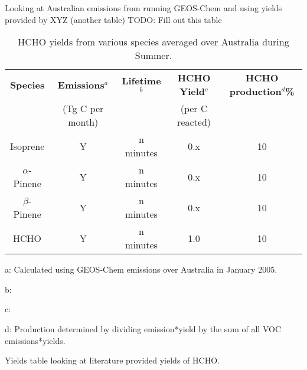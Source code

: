     Looking at Australian emissions from running GEOS-Chem and using yields provided by XYZ (another table)
    TODO: Fill out this table
    \begin{table} \begin{threeparttable}
      \caption{HCHO yields from various species averaged over Australia during Summer.}
      \begin{tabular}{ | c  c  c  c  c | }
        \toprule
	  \textbf{Species}   & \textbf{Emissions$^a$}& \textbf{Lifetime$^b$}& \textbf{HCHO Yield$^c$} & \textbf{HCHO production$^d$\%}
	  \\                 & (Tg C per month)      &                      & (per C reacted)         &         \\
	\midrule
	  Isoprene           & Y                     & n minutes            & 0.x                     & 10       \\
	  $\alpha$-Pinene    & Y                     & n minutes            & 0.x                     & 10       \\
	  $\beta$-Pinene     & Y                     & n minutes            & 0.x                     & 10       \\
	  HCHO               & Y                     & n minutes            & 1.0                     & 10       \\
	\bottomrule
      \end{tabular}
      \begin{tablenotes} 
	  \item a: Calculated using GEOS-Chem emissions over Australia in January 2005.
	  \item b:  
	  \item c: 
	  \item d: Production determined by dividing emission*yield by the sum of all VOC emissions*yields. 
      \end{tablenotes}
      \label{ch_isop:tab:VOCAusYields}
    \end{threeparttable} \end{table}
    
    
    Yields table looking at literature provided yields of HCHO.
    
